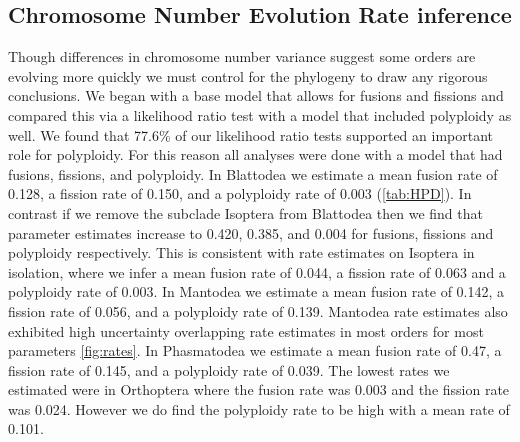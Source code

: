 \subsection{Chromosome Number Evolution Rate inference}
Though differences in chromosome number variance suggest some orders are evolving more quickly we must control for the phylogeny to draw any rigorous conclusions.
We began with a base model that allows for fusions and fissions and compared this via a likelihood ratio test with a model that included polyploidy as well.
We found that 77.6\% of our likelihood ratio tests supported an important role for polyploidy.
For this reason all analyses were done with a model that had fusions, fissions, and polyploidy.
In Blattodea we estimate a mean fusion rate of 0.128, a fission rate of 0.150, and a polyploidy rate of 0.003 (\cref{tab:HPD}).
In contrast if we remove the subclade Isoptera from Blattodea then we find that parameter estimates increase to 0.420, 0.385, and 0.004 for fusions, fissions and polyploidy respectively.
This is consistent with rate estimates on Isoptera in isolation, where we infer a mean fusion rate of 0.044, a fission rate of 0.063 and a polyploidy rate of 0.003.
In Mantodea we estimate a mean fusion rate of 0.142, a fission rate of 0.056, and a polyploidy rate of 0.139.
Mantodea rate estimates also exhibited high uncertainty overlapping rate estimates in most orders for most parameters \cref{fig:rates}.
In Phasmatodea we estimate a mean fusion rate of 0.47, a fission rate of 0.145, and a polyploidy rate of 0.039.
The lowest rates we estimated were in Orthoptera where the fusion rate was 0.003 and the fission rate was 0.024. However we do find the polyploidy rate to be high with a mean rate of 0.101.

